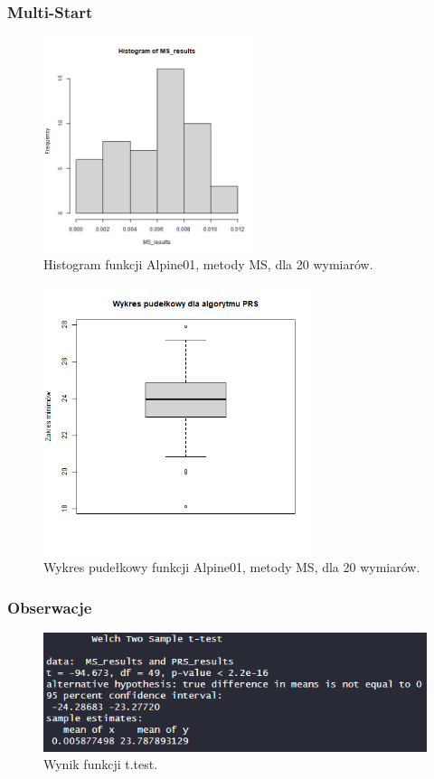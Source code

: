 \documentclass{lab}
\begin{document}
\subsubsection{Multi-Start}
\begin{figure}[H]
  \centering
  \includegraphics[width=0.56\textwidth]{img/dim20_MS_Alpine01_his.png}
  \caption{Histogram funkcji Alpine01, metody MS, dla 20 wymiarów.}
\end{figure}
\begin{figure}[H]
  \centering
  \includegraphics[width=0.7\textwidth]{img/dim20_MS_Alpine01.png}
  \caption{Wykres pudełkowy funkcji Alpine01, metody MS, dla 20 wymiarów.}
\end{figure}

\subsubsection{Obserwacje}
 \begin{figure}[H]
     \centering
     \includegraphics[width=0.9\linewidth]{img/T5.png}
     \caption{Wynik funkcji t.test.}
     \label{fig:enter-label}
 \end{figure}
\end{document}
